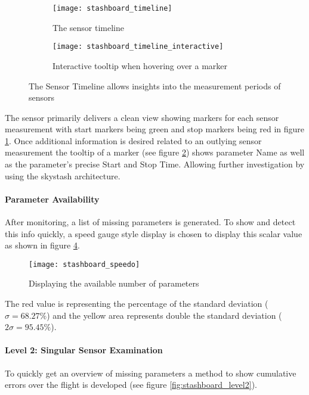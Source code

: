\begin{figure}[!h]
    \centering
    \begin{subfigure}[b]{1\textwidth}
        \texttt{[image: stashboard\_timeline]}
        \caption{The sensor timeline}
        \label{fig:stashboard_timeline_clean}
    \end{subfigure}
    \begin{subfigure}[b]{1\textwidth}
        \texttt{[image: stashboard\_timeline\_interactive]}
        \caption{Interactive tooltip when hovering over a marker}
        \label{fig:stashboard_timeline_interactive}
    \end{subfigure}
    \caption{The Sensor Timeline allows insights into the measurement periods of sensors}
    \label{fig:stashboard_timeline}
\end{figure}

The sensor primarily delivers a clean view showing markers for each sensor measurement with start markers being green and stop markers being red in figure \ref{fig:stashboard_timeline_clean}. Once additional information is desired related to an outlying sensor measurement the tooltip of a marker (see figure \ref{fig:stashboard_timeline_interactive}) shows parameter Name as well as the parameter's precise Start and Stop Time. Allowing further investigation by using the skystash architecture.

\paragraph{Parameter Availability}
After monitoring, a list of missing parameters is generated. To show and detect this info quickly, a speed gauge style display is chosen to display this scalar value as shown in figure \ref{fig:stashboard_speedo}.

\begin{figure}[!h]
    \centering
    \texttt{[image: stashboard\_speedo]}
    \caption{Displaying the available number of parameters}
    \label{fig:stashboard_speedo}
\end{figure}
The red value is representing the percentage of the standard deviation ($\sigma=68.27\%$) and the yellow area represents double the standard deviation ($2\sigma=95.45\%$).

\paragraph{Level 2: Singular Sensor Examination}
To quickly get an overview of missing parameters a method to show cumulative errors over the flight is developed (see figure \ref{fig:stashboard_level2}).


